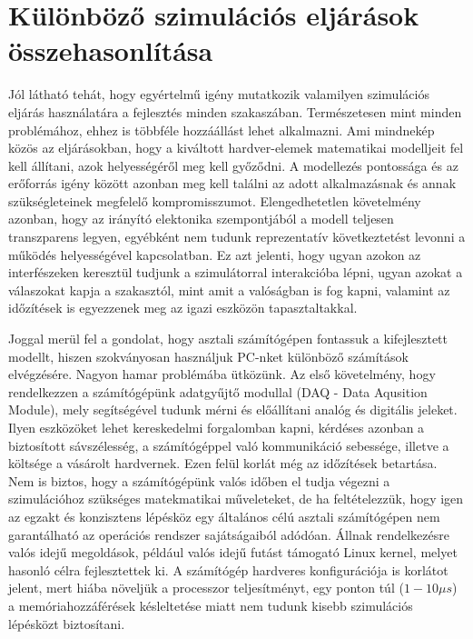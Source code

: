 \section{Különböző szimulációs eljárások összehasonlítása}


Jól látható tehát, hogy egyértelmű igény mutatkozik valamilyen szimulációs eljárás használatára a fejlesztés minden szakaszában. Természetesen mint minden problémához, ehhez is többféle hozzáállást lehet alkalmazni. Ami mindnekép közös az eljárásokban, hogy a kiváltott hardver-elemek matematikai modelljeit fel kell állítani, azok helyességéről meg kell győződni. A modellezés pontossága és az erőforrás igény között azonban meg kell találni az adott alkalmazásnak és annak szükségleteinek megfelelő kompromisszumot. Elengedhetetlen követelmény azonban, hogy az irányító elektonika szempontjából a modell teljesen transzparens legyen, egyébként nem tudunk reprezentatív következtetést levonni a működés helyességével kapcsolatban. Ez azt jelenti, hogy ugyan azokon az interfészeken keresztül tudjunk a szimulátorral interakcióba lépni, ugyan azokat a válaszokat kapja a szakasztól, mint amit a valóságban is fog kapni, valamint az időzítések is egyezzenek meg az igazi eszközön tapasztaltakkal.

Joggal merül fel a gondolat, hogy asztali számítógépen fontassuk a kifejlesztett modellt, hiszen szokványosan használjuk PC-nket különböző számítások elvégzésére. Nagyon hamar problémába ütközünk. Az első követelmény, hogy rendelkezzen a számítógépünk adatgyűjtő modullal (DAQ - Data Aqusition Module), mely segítségével tudunk mérni és előállítani analóg és digitális jeleket. Ilyen eszközöket lehet kereskedelmi forgalomban kapni, kérdéses azonban a biztosított sávszélesség, a számítógéppel való kommunikáció sebessége, illetve a költsége a vásárolt hardvernek. Ezen felül korlát még az időzítések betartása. Nem is biztos, hogy a számítógépünk valós időben el tudja végezni a szimulációhoz szükséges matekmatikai műveleteket, de ha feltételezzük, hogy igen az egzakt és konzisztens lépésköz egy általános célú asztali számítógépen nem garantálható az operációs rendszer sajátságaiból adódóan. Állnak rendelkezésre valós idejű megoldások, például valós idejű futást támogató Linux kernel, melyet hasonló célra fejlesztettek ki. A számítógép hardveres konfigurációja is korlátot jelent, mert hiába növeljük a processzor teljesítményt, egy ponton túl ($1 - 10 \mu{}s$) a memóriahozzáférések késleltetése miatt nem tudunk kisebb szimulációs lépésközt biztosítani.

